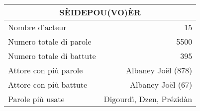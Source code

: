     \begin{table}[]
    \centering
    \begin{tabular}{lr}\toprule\multicolumn{2}{c}{SÈIDEPOU(VO)ÈR} \\\midrule
\multicolumn{1}{l}{Nombre d'acteur}&15\\
\multicolumn{1}{l}{Numero totale di parole}&5500\\
\multicolumn{1}{l}{Numero totale di battute}&395\\
\multicolumn{1}{l}{Attore con più parole}&Albaney Joël (878)\\
\multicolumn{1}{l}{Attore con più battute}&Albaney Joël (67)\\
\multicolumn{1}{l}{Parole più usate}&Digourdì, Dzen, Prézidàn\\
    \bottomrule
    \end{tabular}%
    \end{table}
